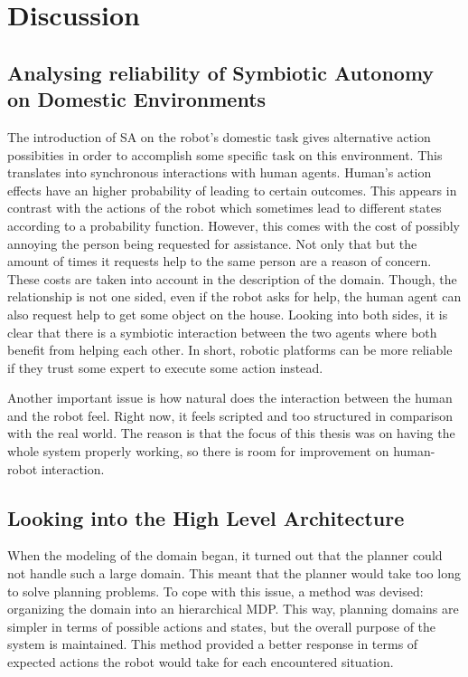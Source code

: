 
\chapter{Discussion}
\label{chapter:discussion}
\section{Analysing reliability of Symbiotic Autonomy on Domestic Environments}
The introduction of \gls{SA} on the robot's domestic task gives
alternative action possibities in order to accomplish some specific task on this
environment.
This translates into synchronous interactions with human agents. Human's action
effects have an higher probability of leading to certain outcomes. This appears
in contrast with the actions of the robot which sometimes lead to different
states according to a probability function.
However, this comes with the cost of possibly annoying the person being
requested for assistance. Not only that but the amount of times it requests help
to the same person are a reason of concern. These costs are taken into account
in the description of the domain.
Though, the relationship is not one sided, even if the robot asks for help,
the human agent can also request help to get some object on the house.
Looking into both sides, it is clear that there is a symbiotic interaction
between the two agents where both benefit from helping each other.
In short, robotic platforms can be more reliable if they trust some expert to
execute some action instead.

Another important issue is how natural does the interaction between the human
and the robot feel. Right now, it feels scripted and too structured in
comparison with the real world. The reason is that the focus of this thesis was
on having the whole system properly working, so there is room for improvement on
human-robot interaction.

\section{Looking into the High Level Architecture}
When the modeling of the domain began, it turned out that the planner could not
handle such a large domain. This meant that the planner would take too long to
solve planning problems.
To cope with this issue, a method was devised: organizing the domain into an
hierarchical \gls{MDP}. This way, planning domains are simpler in terms of
possible actions and states, but the overall purpose of the system is
maintained.
This method provided a better response in terms of expected actions the robot
would take for each encountered situation.

